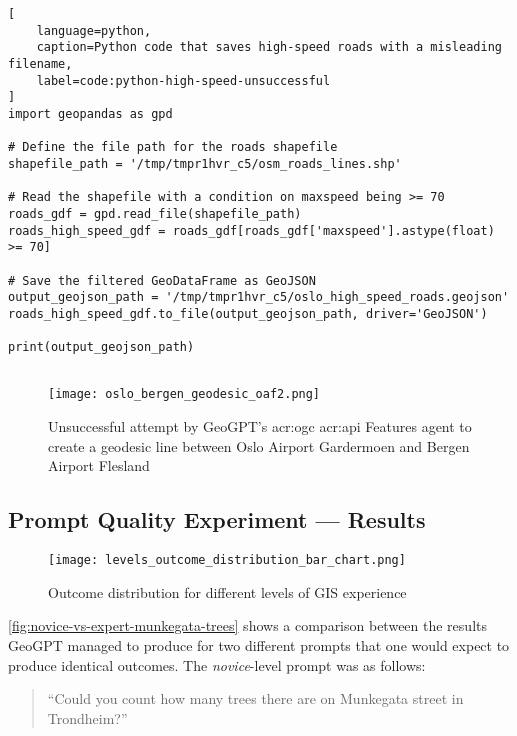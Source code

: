 \begin{lstlisting}[
    language=python,
    caption=Python code that saves high-speed roads with a misleading filename,
    label=code:python-high-speed-unsuccessful
]
import geopandas as gpd

# Define the file path for the roads shapefile
shapefile_path = '/tmp/tmpr1hvr_c5/osm_roads_lines.shp'

# Read the shapefile with a condition on maxspeed being >= 70
roads_gdf = gpd.read_file(shapefile_path)
roads_high_speed_gdf = roads_gdf[roads_gdf['maxspeed'].astype(float) >= 70]

# Save the filtered GeoDataFrame as GeoJSON
output_geojson_path = '/tmp/tmpr1hvr_c5/oslo_high_speed_roads.geojson'
roads_high_speed_gdf.to_file(output_geojson_path, driver='GeoJSON')

print(output_geojson_path)
   
\end{lstlisting}

\begin{figure}
    \centering
    \texttt{[image: oslo\_bergen\_geodesic\_oaf2.png]}
    \caption{Unsuccessful attempt by GeoGPT's \acrshort{acr:ogc} \acrshort{acr:api} Features agent to create a geodesic line between Oslo Airport Gardermoen and Bergen Airport Flesland}
    \label{fig:oaf-geodesic-unsuccessful}
\end{figure}

\subsection{Prompt Quality Experiment --- Results}
\label{subsec:prompt-quality-test-results}

\begin{figure}[htbp]
    \centering
    \texttt{[image: levels\_outcome\_distribution\_bar\_chart.png]}
    \caption{Outcome distribution for different levels of GIS experience}
    \label{fig:outcome-distribution-experience-levels}
\end{figure}

\autoref{fig:novice-vs-expert-munkegata-trees} shows a comparison between the results GeoGPT managed to produce for two different prompts that one would expect to produce identical outcomes. The \textit{novice}-level prompt was as follows:

\begin{quote}
    \enquote{Could you count how many trees there are on Munkegata street in Trondheim?}
\end{quote}

